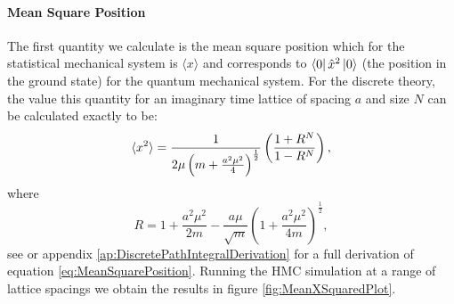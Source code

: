 \documentclass[12pt]{article}
\begin{document}
            \paragraph{Mean Square Position}
                The first quantity we calculate is the mean square position which for the statistical mechanical system is $\langle x \rangle$ and corresponds to $\bra{0}\hat{x}^2\ket{0}$ (the position in the ground state) for the quantum mechanical system. For the discrete theory, the value this quantity for an imaginary time lattice of spacing $a$ and size $N$ can be calculated exactly to be: 
                \begin{equation}
                    \label{eq:MeanSquarePosition}
                    \braket{x^2} = \frac{1}{2\mu\left(m+\frac{a^2\mu^2}{4}\right)^\frac{1}{2}}\left(\frac{1+R^N}{1-R^N}\right),
                \end{equation}
                where
                \begin{equation}
                    \label{eq:R}
                    R = 1 + \frac{a^2\mu^2}{2m} - \frac{a\mu}{\sqrt{m}}\left( 1 + \frac{a^2\mu^2}{4m}\right)^{\frac{1}{2}},
                \end{equation}
                see \cite{creutz_freedman_1981} or appendix \ref{ap:DiscretePathIntegralDerivation} for a full derivation of equation \ref{eq:MeanSquarePosition}. Running the HMC simulation at a range of lattice spacings we obtain the results in figure \ref{fig:MeanXSquaredPlot}.
\end{document}

